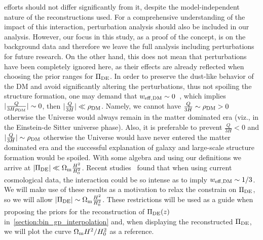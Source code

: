 \documentclass[twocolumn,a4paper,reprint,amssymb,aps,prd,groupedaddress,superscriptaddress,nofootinbib]{revtex4-2}
\begin{document}
efforts should not differ significantly from it, despite the model-independent nature of the reconstructions used. {For a comprehensive understanding of the impact of this interaction, perturbation analysis should also be included in our analysis. However, our focus in this study, as a proof of the concept, is on the background data and therefore we leave the full analysis including perturbations for future research. On the other hand, this does not mean that perturbations have been completely ignored here, as their effects are already reflected when choosing the prior ranges for $\Pi_{\rm DE}$.} In order to preserve the dust-like behavior of the DM and avoid significantly altering the perturbations, thus not spoiling the structure formation, one may demand that $w_{\rm eff,  DM} \sim 0$~\cite{Olivares:2007rt,
Bolotin:2013jpa, Wang:2016lxa}, which implies $|\frac{Q}{3H\rho_{\rm DM}}|\sim 0$, then $|\frac{Q}{3H}|\ll
\rho_{\rm DM}$. Namely, we cannot have $\frac{Q}{3H} \sim \rho_{\rm DM}>0$ otherwise the Universe would always
remain  in the matter dominated era (viz., in the Einstein-de Sitter universe phase). Also, it is preferable
to prevent $\frac{Q}{3H}<0$ and $|\frac{Q}{3H}| \sim \rho_{\rm DM}$ otherwise the Universe would have never
entered the matter dominated era and the successful explanation of galaxy and large-scale structure
formation would be spoiled.
With some algebra and using our definitions we arrive at $|\Pi_{\rm DE} | \ll \Omega_{\rm m}\frac{H^2}{H_0^2}$. Recent studies~\cite{Bernui:2023byc, Zhai:2023yny}  found that when using current cosmological data,
the interaction could be so intense as to imply $w_{\rm eff,  DM }\sim1/3$. We will make use of these results
as a motivation to relax the constrain on $\Pi_{\rm DE}$, so we will allow $|\Pi_{\rm DE} | \sim \Omega_{\rm m}\frac{H^2}{H_0^2}$. {These restrictions will be used as a guide when proposing the priors for the reconstruction of $\Pi_{\rm DE}(z)$ in~\cref{section:bin_gp_interpolation} and, when displaying the reconstructed $\Pi_{\rm DE}$, we will plot the curve $\Omega_{\rm m}H^2/H_0^2$ as a reference.}
\end{document}
